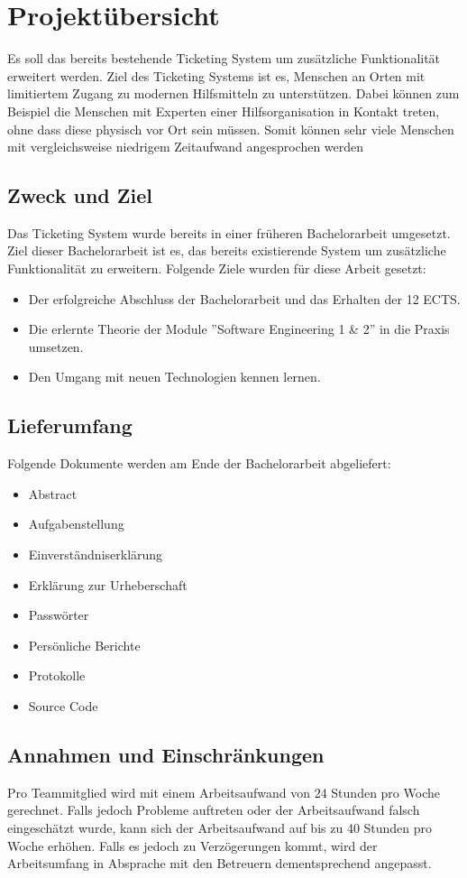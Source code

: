 \section{Projektübersicht}
Es soll das bereits bestehende Ticketing System um zusätzliche Funktionalität erweitert werden. Ziel des Ticketing Systems ist es, Menschen an Orten mit limitiertem Zugang zu modernen Hilfsmitteln zu unterstützen. Dabei können zum Beispiel die Menschen mit Experten einer Hilfsorganisation in Kontakt treten, ohne dass diese physisch vor Ort sein müssen. Somit können sehr viele Menschen mit vergleichsweise niedrigem Zeitaufwand angesprochen werden

\subsection{Zweck und Ziel}
Das Ticketing System wurde bereits in einer früheren Bachelorarbeit umgesetzt. Ziel dieser Bachelorarbeit ist es, das bereits existierende System um zusätzliche Funktionalität zu erweitern.
\medskip
\newline
Folgende Ziele wurden für diese Arbeit gesetzt:
\begin{itemize}
	\itemsep0em
	\item Der erfolgreiche Abschluss der Bachelorarbeit und das Erhalten der 12 ECTS.
	\item Die erlernte Theorie der Module ''Software Engineering 1 \& 2'' in die Praxis umsetzen.
	\item Den Umgang mit neuen Technologien kennen lernen.
\end{itemize}

\subsection{Lieferumfang}
Folgende Dokumente werden am Ende der Bachelorarbeit abgeliefert:
\begin{itemize}
	\itemsep0em
	\item Abstract
	\item Aufgabenstellung
	\item Einverständniserklärung
	\item Erklärung zur Urheberschaft
	\item Passwörter
	\item Persönliche Berichte
	\item Protokolle
	\item Source Code	
\end{itemize}

\subsection{Annahmen und Einschränkungen}
Pro Teammitglied wird mit einem Arbeitsaufwand von 24 Stunden pro Woche gerechnet. Falls jedoch Probleme auftreten oder der Arbeitsaufwand falsch eingeschätzt wurde, kann sich der Arbeitsaufwand auf bis zu 40 Stunden pro Woche erhöhen. Falls es jedoch zu Verzögerungen kommt, wird der Arbeitsumfang in Absprache mit den Betreuern dementsprechend angepasst.

\newpage